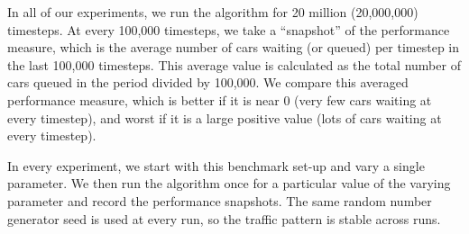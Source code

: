 In all of our experiments, we run the algorithm for 20 million (20,000,000)
timesteps. At every 100,000 timesteps, we take a ``snapshot'' of the performance
measure, which is the average number of cars waiting (or queued) per timestep in
the last 100,000 timesteps. This average value is calculated as the total number
of cars queued in the period divided by 100,000. We compare this averaged
performance measure, which is better if it is near 0 (very few cars waiting at
every timestep), and worst if it is a large positive value (lots of cars waiting
at every timestep).

In every experiment, we start with this benchmark set-up and
vary a single parameter. We then run the algorithm once for a particular
value of the varying parameter and record the performance snapshots.
The same random number generator seed is used at every run, so the
traffic pattern is stable across runs.
